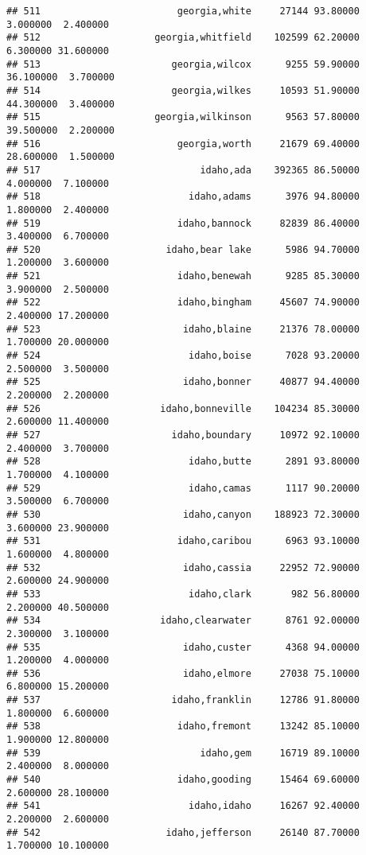 \documentclass[
]{article}
\begin{document}
\begin{verbatim}
## 511                        georgia,white     27144 93.80000  3.000000  2.400000
## 512                    georgia,whitfield    102599 62.20000  6.300000 31.600000
## 513                       georgia,wilcox      9255 59.90000 36.100000  3.700000
## 514                       georgia,wilkes     10593 51.90000 44.300000  3.400000
## 515                    georgia,wilkinson      9563 57.80000 39.500000  2.200000
## 516                        georgia,worth     21679 69.40000 28.600000  1.500000
## 517                            idaho,ada    392365 86.50000  4.000000  7.100000
## 518                          idaho,adams      3976 94.80000  1.800000  2.400000
## 519                        idaho,bannock     82839 86.40000  3.400000  6.700000
## 520                      idaho,bear lake      5986 94.70000  1.200000  3.600000
## 521                        idaho,benewah      9285 85.30000  3.900000  2.500000
## 522                        idaho,bingham     45607 74.90000  2.400000 17.200000
## 523                         idaho,blaine     21376 78.00000  1.700000 20.000000
## 524                          idaho,boise      7028 93.20000  2.500000  3.500000
## 525                         idaho,bonner     40877 94.40000  2.200000  2.200000
## 526                     idaho,bonneville    104234 85.30000  2.600000 11.400000
## 527                       idaho,boundary     10972 92.10000  2.400000  3.700000
## 528                          idaho,butte      2891 93.80000  1.700000  4.100000
## 529                          idaho,camas      1117 90.20000  3.500000  6.700000
## 530                         idaho,canyon    188923 72.30000  3.600000 23.900000
## 531                        idaho,caribou      6963 93.10000  1.600000  4.800000
## 532                         idaho,cassia     22952 72.90000  2.600000 24.900000
## 533                          idaho,clark       982 56.80000  2.200000 40.500000
## 534                     idaho,clearwater      8761 92.00000  2.300000  3.100000
## 535                         idaho,custer      4368 94.00000  1.200000  4.000000
## 536                         idaho,elmore     27038 75.10000  6.800000 15.200000
## 537                       idaho,franklin     12786 91.80000  1.800000  6.600000
## 538                        idaho,fremont     13242 85.10000  1.900000 12.800000
## 539                            idaho,gem     16719 89.10000  2.400000  8.000000
## 540                        idaho,gooding     15464 69.60000  2.600000 28.100000
## 541                          idaho,idaho     16267 92.40000  2.200000  2.600000
## 542                      idaho,jefferson     26140 87.70000  1.700000 10.100000

\end{verbatim}
\end{document}
